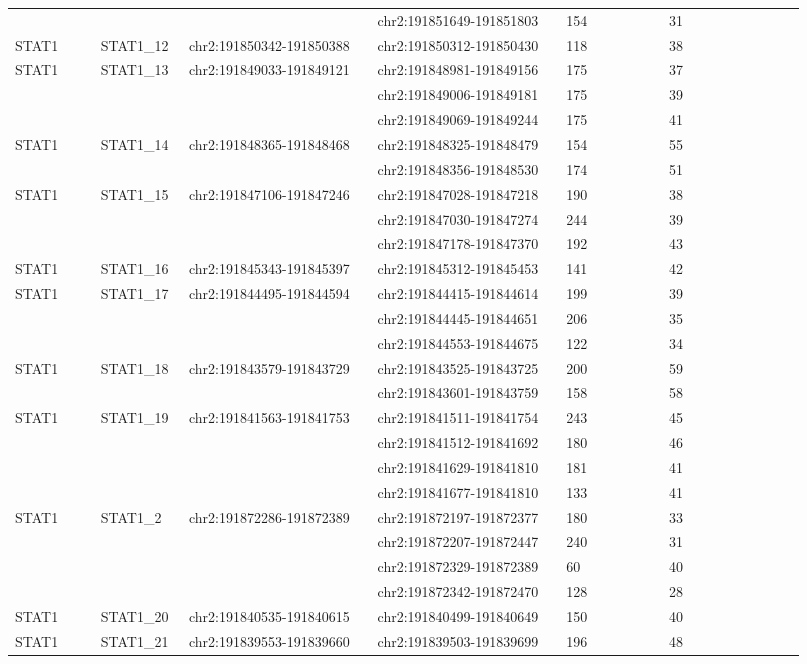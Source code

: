 \begin{landscape}
\begin{longtable}{p{0.1\linewidth}|p{0.1\linewidth}p{0.22\linewidth}p{0.22\linewidth}p{0.12\linewidth}p{0.16\linewidth}}
\\
 & & & chr2:191851649-191851803 & 154 & 31
\\
STAT1 & STAT1\_12 & chr2:191850342-191850388 & chr2:191850312-191850430 & 118 & 38
\\
STAT1 & STAT1\_13 & chr2:191849033-191849121 & chr2:191848981-191849156 & 175 & 37
\\
 & & & chr2:191849006-191849181 & 175 & 39
\\
 & & & chr2:191849069-191849244 & 175 & 41
\\
STAT1 & STAT1\_14 & chr2:191848365-191848468 & chr2:191848325-191848479 & 154 & 55
\\
 & & & chr2:191848356-191848530 & 174 & 51
\\
STAT1 & STAT1\_15 & chr2:191847106-191847246 & chr2:191847028-191847218 & 190 & 38
\\
 & & & chr2:191847030-191847274 & 244 & 39
\\
 & & & chr2:191847178-191847370 & 192 & 43
\\
STAT1 & STAT1\_16 & chr2:191845343-191845397 & chr2:191845312-191845453 & 141 & 42
\\
STAT1 & STAT1\_17 & chr2:191844495-191844594 & chr2:191844415-191844614 & 199 & 39
\\
 & & & chr2:191844445-191844651 & 206 & 35
\\
 & & & chr2:191844553-191844675 & 122 & 34
\\
STAT1 & STAT1\_18 & chr2:191843579-191843729 & chr2:191843525-191843725 & 200 & 59
\\
 & & & chr2:191843601-191843759 & 158 & 58
\\
STAT1 & STAT1\_19 & chr2:191841563-191841753 & chr2:191841511-191841754 & 243 & 45
\\
 & & & chr2:191841512-191841692 & 180 & 46
\\
 & & & chr2:191841629-191841810 & 181 & 41
\\
 & & & chr2:191841677-191841810 & 133 & 41
\\
STAT1 & STAT1\_2 & chr2:191872286-191872389 & chr2:191872197-191872377 & 180 & 33
\\
 & & & chr2:191872207-191872447 & 240 & 31
\\
 & & & chr2:191872329-191872389 & 60 & 40
\\
 & & & chr2:191872342-191872470 & 128 & 28
\\
STAT1 & STAT1\_20 & chr2:191840535-191840615 & chr2:191840499-191840649 & 150 & 40
\\
STAT1 & STAT1\_21 & chr2:191839553-191839660 & chr2:191839503-191839699 & 196 & 48

\end{longtable}
\end{landscape}
